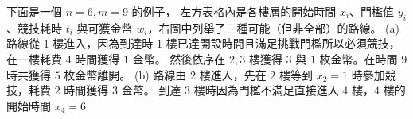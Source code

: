 下面是一個 \begin{math}n=6, m=9\end{math} 的例子，
左方表格內是各樓層的開始時間 \begin{math}x_i\end{math}、門檻值
\begin{math}y_i\end{math}、競技耗時 \begin{math}t_i\end{math} 與可獲金幣
\begin{math}w_i\end{math}，右圖中列舉了三種可能（但非全部）的路線。 (a)
路線從 \begin{math}1\end{math} 樓進入，因為到達時
\begin{math}1\end{math}
樓已達開設時間且滿足挑戰門檻所以必須競技，在一樓耗費
\begin{math}4\end{math} 時間獲得 \begin{math}1\end{math} 金幣。
然後依序在 \begin{math}2,3\end{math} 樓獲得 \begin{math}3\end{math} 與
\begin{math}1\end{math} 枚金幣。在時間 \begin{math}9\end{math} 時共獲得
\begin{math}5\end{math} 枚金幣離開。 (b) 路線由 \begin{math}2\end{math}
樓進入，先在 \begin{math}2\end{math} 樓等到
\begin{math}x_2 = 1\end{math} 時參加競技，耗費 \begin{math}2\end{math}
時間獲得 \begin{math}3\end{math} 金幣。 到達 \begin{math}3\end{math}
樓時因為門檻不滿足直接進入 \begin{math}4\end{math}
樓，\begin{math}4\end{math} 樓的開始時間 \begin{math}x_4=6\end{math}
